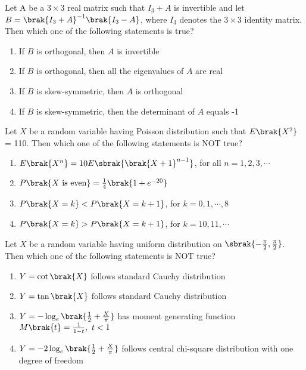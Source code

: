 \iffalse
\chapter{2021}
\author{AI24BTECH11009}
\section{st}
\fi

\item Let A be a $3 \times 3$ real matrix such that $I_3 + A$ is invertible and let $B = \brak{I_3 + A}^{-1}\brak{I_3 - A}$, where $I_3$ denotes the $3 \times 3$ identity matrix. Then which one of the following statements is true?
\begin{enumerate}
    \item If $B$ is orthogonal, then $A$ is invertible
    \item If $B$ is orthogonal, then all the eigenvalues of $A$ are real
    \item If $B$ is skew-symmetric, then $A$ is orthogonal
    \item If $B$ is skew-symmetric, then the determinant of $A$ equals -1 \\
\end{enumerate}
\item Let $X$ be a random variable having Poisson distribution such that $E\brak{X^2}$ = 110. Then which one of the following statements is NOT true?
\begin{enumerate}
    \item $E\brak{X^n} = 10 E\sbrak{\brak{X + 1}^{n-1}}$, for all $n = 1, 2, 3, \cdots$
    \item $P\brak{X\text{ is even}} = \frac{1}{4}\brak{1 + e^{-20}}$
    \item $P\brak{X = k} < P\brak{X = k + 1}$, for $k = 0, 1, \cdots, 8$
    \item $P\brak{X = k} > P\brak{X = k + 1}$, for $k = 10, 11, \cdots$ \\
\end{enumerate}
\item Let $X$ be a random variable having uniform distribution on $\sbrak{-\frac{\pi}{2}, \frac{\pi}{2}}$. Then which one of the following statements is NOT true?
\begin{enumerate}
    \item $Y = \cot\brak{X}$ follows standard Cauchy distribution
    \item $Y = \tan\brak{X}$ follows standard Cauchy distribution
    \item $Y = -\log_e\brak{\frac{1}{2} + \frac{X}{\pi}}$ has moment generating function $M\brak{t} = \frac{1}{1 - t},\ t < 1$
    \item $Y = -2\log_e\brak{\frac{1}{2} + \frac{X}{\pi}}$ follows central chi-square distribution with one degree of freedom \\
\end{enumerate}
